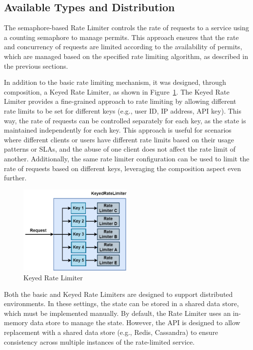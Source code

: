 \subsection{Available Types and Distribution}\label{subsec:rate-limiter-types-distribution}

The semaphore-based Rate Limiter controls the rate of requests to a service
using a counting semaphore to manage permits.
This approach ensures that the rate and concurrency of requests are limited according to the availability of permits,
which are managed based on the specified rate limiting algorithm,
as described in the previous sections.

In addition to the basic rate limiting mechanism, it was designed, through composition, a Keyed Rate Limiter, as shown in Figure~\ref{fig:keyed-rate-limiter}.
The Keyed Rate Limiter provides a fine-grained approach to rate limiting
by allowing different rate limits to be set for different keys
(e.g., user ID, IP address, API key).
This way, the rate of requests can be controlled separately for each key, as the state is maintained
independently for each key.
This approach is useful for scenarios
where different clients or users have different rate limits based on their usage patterns or SLAs,
and the abuse of one client does not affect the rate limit of another.
Additionally, the same rate limiter configuration can be used to limit the rate of requests based on different keys,
leveraging the composition aspect even further.

\begin{figure}[!htb]
    \centering
    \includegraphics[width=0.5\textwidth]{../figures/06_keyed-rate-limiter}
    \caption{Keyed Rate Limiter}
    \label{fig:keyed-rate-limiter}
\end{figure}

Both the basic and Keyed Rate Limiters are designed to support distributed environments.
In these settings, the state can be stored in a shared data store,
which must be implemented manually.
By default, the Rate Limiter uses an in-memory data store to manage the state.
However,
the API is designed to allow replacement with a shared data store
(e.g., Redis, Cassandra) to ensure consistency across multiple instances of the rate-limited service.

